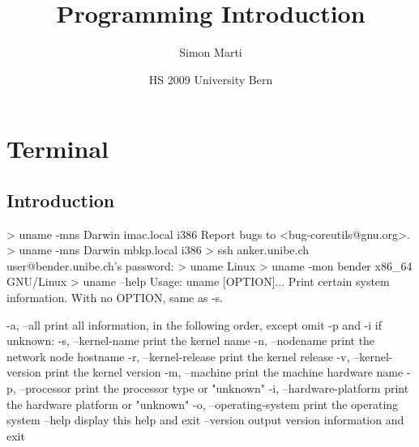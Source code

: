 \documentclass[10pt,a4paper]{scrartcl}
\date{HS 2009 University Bern}
\author{Simon Marti}
\title{Programming Introduction}
\begin{document}
\section{Terminal}
\subsection{Introduction}
\begin{terminalcode}
> uname -mns
  Darwin imac.local i386
  Report bugs to <bug-coreutils@gnu.org>.
> uname -mns
  Darwin mbkp.local i386
> ssh anker.unibe.ch
  user@bender.unibe.ch's password: 
> uname
  Linux
> uname -mon
  bender x86_64 GNU/Linux
> uname --help
  Usage: uname [OPTION]...
  Print certain system information.  With no OPTION, same as -s.
  
    -a, --all                print all information, in the following order,
                               except omit -p and -i if unknown:
    -s, --kernel-name        print the kernel name
    -n, --nodename           print the network node hostname
    -r, --kernel-release     print the kernel release
    -v, --kernel-version     print the kernel version
    -m, --machine            print the machine hardware name
    -p, --processor          print the processor type or "unknown"
    -i, --hardware-platform  print the hardware platform or "unknown"
    -o, --operating-system   print the operating system
        --help     display this help and exit
        --version  output version information and exit
\end{terminalcode}

\end{document}
